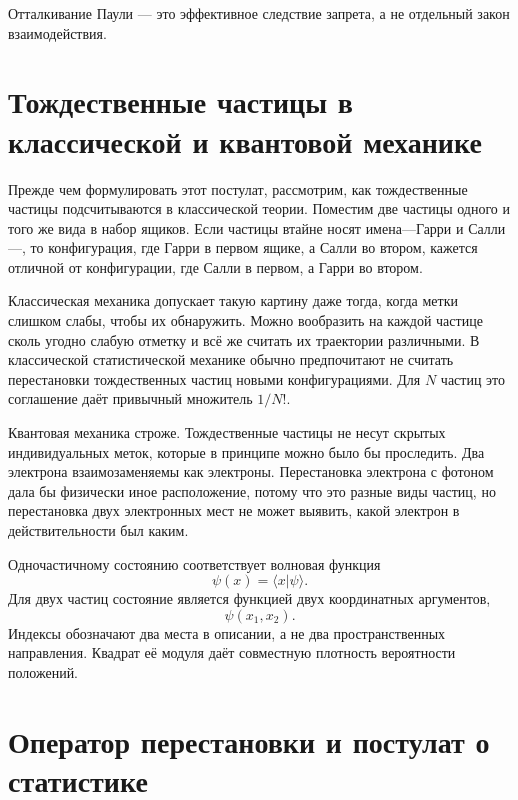 Отталкивание Паули — это эффективное следствие запрета, а не отдельный закон взаимодействия.

\begin{classroomqa}
\end{classroomqa}

\section{Тождественные частицы в классической и квантовой механике}

Прежде чем формулировать этот постулат, рассмотрим, как тождественные частицы подсчитываются в классической теории. Поместим две частицы одного и того же вида в набор ящиков. Если частицы втайне носят имена---Гарри и Салли---, то конфигурация, где Гарри в первом ящике, а Салли во втором, кажется отличной от конфигурации, где Салли в первом, а Гарри во втором.

Классическая механика допускает такую картину даже тогда, когда метки слишком слабы, чтобы их обнаружить. Можно вообразить на каждой частице сколь угодно слабую отметку и всё же считать их траектории различными. В классической статистической механике обычно предпочитают не считать перестановки тождественных частиц новыми конфигурациями. Для \(N\) частиц это соглашение даёт привычный множитель \(1/N!\).

Квантовая механика строже. Тождественные частицы не несут скрытых индивидуальных меток, которые в принципе можно было бы проследить. Два электрона взаимозаменяемы как электроны. Перестановка электрона с фотоном дала бы физически иное расположение, потому что это разные виды частиц, но перестановка двух электронных мест не может выявить, какой электрон в действительности был каким.

Одночастичному состоянию соответствует волновая функция
\[
\psi(x)=\langle x\vert\psi\rangle.
\]
Для двух частиц состояние является функцией двух координатных аргументов,
\begin{equation}
\psi(x_{1},x_{2}).
\end{equation}
Индексы обозначают два места в описании, а не два пространственных направления. Квадрат её модуля даёт совместную плотность вероятности положений.

\section{Оператор перестановки и постулат о статистике}

